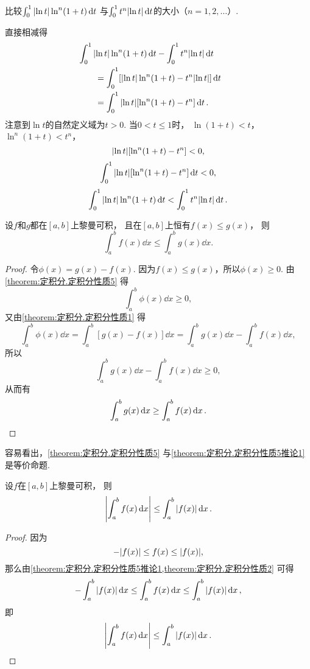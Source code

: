 \begin{example}
比较\(\int_0^1 \abs{\ln t} \ln^n(1+t) \dd{t}\)
与\(\int_0^1 t^n \abs{\ln t} \dd{t}\)的大小（\(n=1,2,\dotsc\)）.
\begin{solution}
直接相减得
\begin{align*}
	&\hspace{-20pt}
	\int_0^1 \abs{\ln t} \ln^n(1+t) \dd{t} - \int_0^1 t^n \abs{\ln t} \dd{t} \\
	&= \int_0^1 [\abs{\ln t} \ln^n(1+t) - t^n \abs{\ln t}] \dd{t} \\
	&= \int_0^1 \abs{\ln t} [\ln^n(1+t) - t^n] \dd{t}.
\end{align*}
注意到\(\ln t\)的自然定义域为\(t > 0\).
当\(0 < t \leq 1\)时，
\(\ln(1+t) < t\)，
\(\ln^n(1+t) < t^n\)，
\[
	\abs{\ln t} [\ln^n(1+t) - t^n] < 0,
\]\[
	\int_0^1 \abs{\ln t} [\ln^n(1+t) - t^n] \dd{t} < 0,
\]\[
	\int_0^1 \abs{\ln t} \ln^n(1+t) \dd{t} < \int_0^1 t^n \abs{\ln t} \dd{t}.
\]
\end{solution}
\end{example}

\begin{corollary}\label{theorem:定积分.定积分性质5推论1}
设\(f\)和\(g\)都在\([a,b]\)上黎曼可积，
且在\([a,b]\)上恒有\(f(x) \leq g(x)\)，
则\[
	\int_a^b f(x) \dd{x} \leq \int_a^b g(x) \dd{x}.
\]
\begin{proof}
令\(\phi(x) = g(x) - f(x)\).
因为\(f(x) \leq g(x)\)，所以\(\phi(x) \geq 0\).
由\cref{theorem:定积分.定积分性质5} 得\[
	\int_a^b \phi(x) \dd{x} \geq 0,
\]
又由\cref{theorem:定积分.定积分性质1} 得\[
	\int_a^b \phi(x) \dd{x}
	= \int_a^b [g(x) - f(x)] \dd{x}
	= \int_a^b g(x) \dd{x} - \int_a^b f(x) \dd{x},
\]
所以\[
	\int_a^b g(x) \dd{x} - \int_a^b f(x) \dd{x} \geq 0,
\]
从而有\[
	\int_a^b g(x) \dd{x} \geq \int_a^b f(x) \dd{x}.
	\qedhere
\]
\end{proof}
\end{corollary}
\begin{remark}
容易看出，\cref{theorem:定积分.定积分性质5}
与\cref{theorem:定积分.定积分性质5推论1}
是等价命题.
\end{remark}

\begin{corollary}\label{theorem:定积分.定积分性质5推论2}
设\(f\)在\([a,b]\)上黎曼可积，
则\begin{equation}
	\abs{\int_a^b f(x) \dd{x}} \leq \int_a^b \abs{f(x)} \dd{x}.
\end{equation}
\begin{proof}
因为\[
	-\abs{f(x)} \leq f(x) \leq \abs{f(x)},
\]
那么由\cref{theorem:定积分.定积分性质5推论1,theorem:定积分.定积分性质2} 可得\[
	-\int_a^b \abs{f(x)} \dd{x}
	\leq
	\int_a^b f(x) \dd{x}
	\leq
	\int_a^b \abs{f(x)} \dd{x},
\]
即\[
	\abs{\int_a^b f(x) \dd{x}} \leq \int_a^b \abs{f(x)} \dd{x}.
	\qedhere
\]
\end{proof}
\end{corollary}

